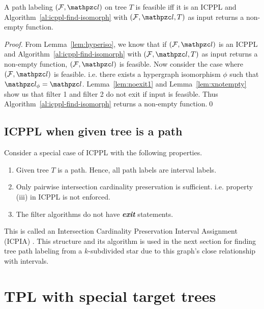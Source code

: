 \documentclass[MS]             %
              {iitmdiss_as}    %
\begin{document}
\begin{theorem}
  \label{th:charac}
  A path labeling $(\cF, \cl)$ on tree $T$ is feasible iff it is an
  ICPPL and Algorithm~\ref{al:icppl-find-isomorph} with $(\cF, \cl,
  T)$ as input returns a non-empty function.
\end{theorem}
\begin{proof}
  From Lemma~\ref{lem:hyperiso}, we know that if $(\cF, \cl)$ is an
  ICPPL and Algorithm~\ref{al:icppl-find-isomorph} with $(\cF, \cl,
  T)$ as input returns a non-empty function, $(\cF, \cl)$ is feasible.
  Now consider the case where $(\cF, \cl)$ is feasible. i.e. there
  exists a hypergraph isomorphism $\phi$ such that $\cl_\phi =
  \cl$. Lemma~\ref{lem:noexit1} and Lemma~\ref{lem:xnotempty} show us
  that filter 1 and filter 2 do not exit if input is feasible. Thus
  Algorithm~\ref{al:icppl-find-isomorph} returns a non-empty function.\qed
\end{proof}


\subsection{ICPPL when given tree is a path}
\label{subsec:icpplicpia}

Consider a special case of ICPPL with the following properties.
\begin{enumerate}
\item Given tree $T$ is a path. Hence, all path labels are interval labels.
\item Only pairwise intersection cardinality
  preservation is sufficient. i.e. property (iii) in ICPPL is not enforced.
\item The filter algorithms do not have {\em \bf exit} statements.
\end{enumerate}
This is called an Intersection Cardinality Preservation Interval
Assignment (ICPIA) \cite{nsnrs09}. This structure and its algorithm is
used in the next section for finding tree path labeling from a
$k$-subdivided star due to this graph's close relationship with
intervals. 

\section{ TPL with special target trees}
\end{document}
